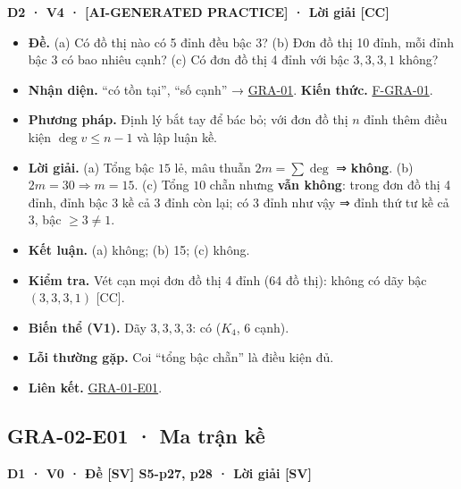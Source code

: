 \documentclass[
  10pt,
  twoside,openany]{book}
\providecommand{\tightlist}{%
  \setlength{\itemsep}{0pt}\setlength{\parskip}{0pt}}
\begin{document}
\textbf{D2 · V4 · {[}AI-GENERATED PRACTICE{]} · Lời giải {[}CC{]}}

\begin{itemize}
\tightlist
\item
  \textbf{Đề.} (a) Có đồ thị nào có 5 đỉnh đều bậc 3? (b) Đơn đồ thị 10
  đỉnh, mỗi đỉnh bậc 3 có bao nhiêu cạnh? (c) Có đơn đồ thị 4 đỉnh với
  bậc \(3,3,3,1\) không?
\item
  \textbf{Nhận diện.} ``có tồn tại'', ``số cạnh'' →
  \protect\hyperlink{GRA-01}{GRA-01}. \textbf{Kiến thức.}
  \protect\hyperlink{F-GRA-01}{F-GRA-01}.
\item
  \textbf{Phương pháp.} Định lý bắt tay để bác bỏ; với đơn đồ thị \(n\)
  đỉnh thêm điều kiện \(\deg v\le n-1\) và lập luận kề.
\item
  \textbf{Lời giải.} (a) Tổng bậc \(15\) lẻ, mâu thuẫn \(2m=\sum\deg\) ⇒
  \textbf{không}. (b) \(2m=30\Rightarrow m=15\). (c) Tổng \(10\) chẵn
  nhưng \textbf{vẫn không}: trong đơn đồ thị 4 đỉnh, đỉnh bậc 3 kề cả 3
  đỉnh còn lại; có 3 đỉnh như vậy ⇒ đỉnh thứ tư kề cả 3, bậc
  \(\ge3\ne1\).
\item
  \textbf{Kết luận.} (a) không; (b) 15; (c) không.
\item
  \textbf{Kiểm tra.} Vét cạn mọi đơn đồ thị 4 đỉnh (64 đồ thị): không có
  dãy bậc \((3,3,3,1)\) {[}CC{]}.
\item
  \textbf{Biến thể (V1).} Dãy \(3,3,3,3\): có (\(K_4\), 6 cạnh).
\item
  \textbf{Lỗi thường gặp.} Coi ``tổng bậc chẵn'' là điều kiện đủ.
\item
  \textbf{Liên kết.} \protect\hyperlink{GRA-01-E01}{GRA-01-E01}.
\end{itemize}

\hypertarget{GRA-02-E01}{%
\subsection{GRA-02-E01 · Ma trận kề}\label{GRA-02-E01}}

\textbf{D1 · V0 · Đề {[}SV{]} S5-p27, p28 · Lời giải {[}SV{]}}
\end{document}
